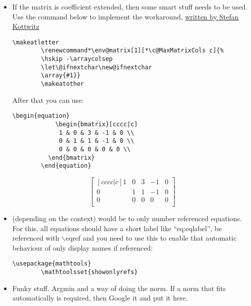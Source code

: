 \begin{itemize}
    \item If the matrix is coefficient extended, then some smart stuff needs to be used. Use the command below to implement the workaround, \href{http://texblog.net/latex-archive/maths/amsmath-matrix/}{\ul{written by Stefan Kottwitz}}
    \begin{lstlisting}[language = Tex, numbers = none]
        \makeatletter
        \renewcommand*\env@matrix[1][*\c@MaxMatrixCols c]{%
        \hskip -\arraycolsep
        \let\@ifnextchar\new@ifnextchar
        \array{#1}}
        \makeatother
    \end{lstlisting}
    After that you can use:
    \begin{lstlisting}[language = Tex, numbers = none]
        \begin{equation}
            \begin{bmatrix}[cccc|c]
             1 & 0 & 3 & -1 & 0 \\
             0 & 1 & 1 & -1 & 0 \\
             0 & 0 & 0 & 0 & 0 \\
          \end{bmatrix}
        \end{equation}
    \end{lstlisting}
    \begin{equation}
        \begin{bmatrix}[cccc|c]
         1 & 0 & 3 & -1 & 0 \\
         0 & 1 & 1 & -1 & 0 \\
         0 & 0 & 0 & 0 & 0 \\
        \end{bmatrix}
    \end{equation}
    \item {} (depending on the context) would be to only number referenced equations. For this, all equations should have a short label like ``eq:eqlabel'', be referenced with $\backslash$eqref and you need to use this to enable that automatic behaviour of only display names if referenced:
    \begin{lstlisting}[language = Tex, numbers = none]
        \usepackage{mathtools}
        \mathtoolsset{showonlyrefs}
    \end{lstlisting}
    \item Funky stuff. Argmin and a way of doing the norm. If a norm that fits automatically is required, then Google it and put it  here.
    \begin{lstlisting}[language = Tex, numbers = none]

\end{lstlisting}
\end{itemize}
